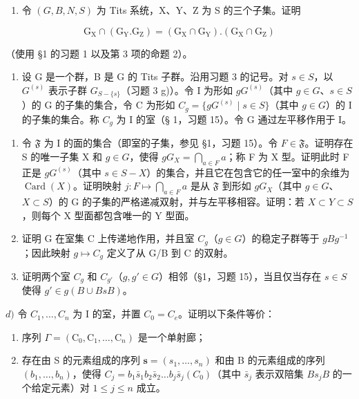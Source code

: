 \begin{enumerate}
\def\labelenumi{\arabic{enumi})}
\setcounter{enumi}{8}
\tightlist
\item
  令 \((G, B, N, S)\) 为 Tits 系统，X、Y、Z 为 S 的三个子集。证明
\end{enumerate}

\[
\mathrm{G} _ {\mathrm{X}} \cap (\mathrm{G} _ {\mathrm{Y}}. \mathrm{G} _ {\mathrm{Z}}) = (\mathrm{G} _ {\mathrm{X}} \cap \mathrm{G} _ {\mathrm{Y}}). (\mathrm{G} _ {\mathrm{X}} \cap \mathrm{G} _ {\mathrm{Z}})
\]

（使用 §1 的习题 1 以及第 3 项的命题 2）。

\begin{enumerate}
\def\labelenumi{\arabic{enumi})}
\setcounter{enumi}{9}
\tightlist
\item
  设 G 是一个群，B 是 G 的 Tits 子群。沿用习题 3 的记号。对 \(s \in S\)，以 \(G^{(s)}\) 表示子群 \(G_{S - \{s\}}\)（习题 3 g)）。令 I 为形如 \(gG^{(s)}\)（其中 \(g \in G\)、\(s \in S\)）的 G 的子集的集合，令 C 为形如 \(C_g = \{gG^{(s)} \mid s \in S\}\)（其中 \(g \in G\)）的 I 的子集的集合。称 \(C_g\) 为 I 的室（§ 1，习题 15）。令 G 通过左平移作用于 I。
\end{enumerate}

\begin{enumerate}
\def\labelenumi{\alph{enumi})}
\item
  令 \(\mathfrak{F}\) 为 I 的面的集合（即室的子集，参见 §1，习题 15）。令 \(F \in \mathfrak{F}\)。证明存在 S 的唯一子集 X 和 \(g \in G\)，使得 \(gG_{X} = \bigcap_{a \in F} a\)；称 F 为 X 型。证明此时 F 正是 \(gG^{(s)}\)（其中 \(s \in S - X\)）的集合，并且它在包含它的任一室中的余维为 \(\operatorname{Card}(X)\)。证明映射 \(j: F \mapsto \bigcap_{a \in F} a\) 是从 \(\mathfrak{F}\) 到形如 \(gG_{X}\)（其中 \(g \in G\)、\(X \subset S\)）的 G 的子集的严格递减双射，并与左平移相容。证明：若 \(X \subset Y \subset S\)，则每个 X 型面都包含唯一的 Y 型面。
\item
  证明 G 在室集 C 上传递地作用，并且室 \(C_{g}\)（\(g \in G\)）的稳定子群等于 \(gBg^{-1}\)；因此映射 \(g \mapsto C_{g}\) 定义了从 G/B 到 C 的双射。
\item
  证明两个室 \(C_{g}\) 和 \(C_{g'}\)（\(g, g' \in G\)）相邻（§1，习题 15），当且仅当存在 \(s \in S\) 使得 \(g' \in g(B \cup BsB)\)。
\end{enumerate}

\(d)\) 令 \(C_1, \ldots, C_n\) 为 I 的室，并置 \(C_0 = C_e\)。证明以下条件等价：

\begin{enumerate}
\def\labelenumi{(\roman{enumi})}
\item
  序列 \(\Gamma = (\mathrm{C}_0, \mathrm{C}_1, \ldots, \mathrm{C}_n)\) 是一个单射廊；
\item
  存在由 S 的元素组成的序列 \(\mathbf{s} = (s_1, \ldots, s_n)\) 和由 B 的元素组成的序列 \((b_1, \ldots, b_n)\)，使得 \(C_j = b_1 \bar{s}_1 b_2 \bar{s}_2 \ldots b_j \bar{s}_j (C_0)\)（其中 \(\bar{s}_j\) 表示双陪集 \(Bs_jB\) 的一个给定元素）对 \(1 \leqslant j \leqslant n\) 成立。
\end{enumerate}

